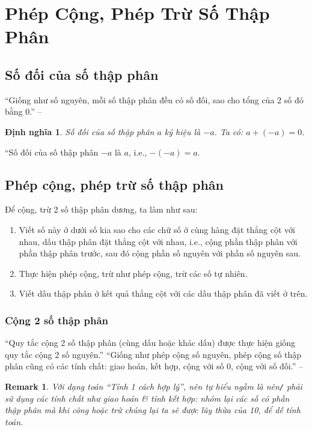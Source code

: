 \documentclass[oneside]{book}
\numberwithin{equation}{section}
\newtheorem{dinhnghia}{Định nghĩa}[section]
\newtheorem{remark}{Remark}[section]
\begin{document}
\section{Phép Cộng, Phép Trừ Số Thập Phân}

\subsection{Số đối của số thập phân}
``Giống như số nguyên, mỗi số thập phân đều có số đối, sao cho tổng của 2 số đó bằng 0.'' -- \cite[p. 48]{Thai_Anh_Dat_Ha_Loan_Nam_Quang_Toan_6_tap_2}

\begin{dinhnghia}
	\emph{Số đối} của số thập phân $a$ ký hiệu là $-a$. Ta có: $a + (-a) = 0$.
\end{dinhnghia}
``Số đối của số thập phân $-a$ là $a$, i.e., $-(-a) = a$.

\subsection{Phép cộng, phép trừ số thập phân}
Để cộng, trừ 2 số thập phân dương, ta làm như sau:
\begin{enumerate}
	\item Viết số này ở dưới số kia sao cho các chữ số ở cùng hàng đặt thẳng cột với nhau, dấu thập phân đặt thẳng cột với nhau, i.e., cộng phần thập phân với phần thập phân trước, sau đó cộng phần số nguyên với phần số nguyên sau.
	\item Thực hiện phép cộng, trừ như phép cộng, trừ các số tự nhiên.
	\item Viết dấu thập phân ở kết quả thẳng cột với các dấu thập phân đã viết ở trên.
\end{enumerate}

\subsubsection{Cộng 2 số thập phân}
``Quy tắc cộng 2 số thập phân (cùng dấu hoặc khác dấu) được thực hiện giống quy tắc cộng 2 số nguyên.'' ``Giống như phép cộng số nguyên, phép cộng số thập phân cũng có các tính chất: giao hoán, kết hợp, cộng với số 0, cộng với số đối.'' -- \cite[p. 49]{Thai_Anh_Dat_Ha_Loan_Nam_Quang_Toan_6_tap_2}

\begin{remark}
	Với dạng toán ``Tính 1 cách hợp lý'', nên tự hiểu ngầm là nên\emph{\texttt{/}} phải sử dụng các tính chất như giao hoán \textit{\&} tính kết hợp: nhóm lại các số có phần thập phân mà khi công hoặc trừ chúng lại ta sẽ được lũy thừa của 10, để dễ tính toán.
\end{remark}
\end{document}
